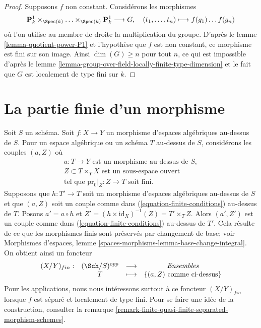 \begin{proof}
Supposons $f$ non constant. Considérons les morphismes
$$
\mathbf{P}^1_k \times_{\Spec(k)} \ldots \times_{\Spec(k)} \mathbf{P}^1_k
\longrightarrow G,
\quad (t_1, \ldots, t_n) \longmapsto f(g_1) \ldots f(g_n)
$$
où l'on utilise au membre de droite la multiplication du groupe.
D'après le lemme \ref{lemma-quotient-power-P1} et l'hypothèse que $f$
est non constant, ce morphisme est fini sur son image.
Ainsi $\dim(G) \geq n$ pour tout $n$, ce qui est impossible d'après le
lemme \ref{lemma-group-over-field-locally-finite-type-dimension}
et le fait que $G$ est localement de type fini sur $k$.
\end{proof}




\section{La partie finie d'un morphisme}
\label{section-finite}

\noindent
Soit $S$ un schéma.
Soit $f : X \to Y$ un morphisme d'espaces algébriques au-dessus de $S$.
Pour un espace algébrique ou un schéma $T$ au-dessus de $S$, considérons les couples
$(a, Z)$ où
\begin{equation}
\label{equation-finite-conditions}
\begin{matrix}
a : T \to Y\text{ est un morphisme au-dessus de }S, \\
Z \subset T \times_Y X\text{ est un sous-espace ouvert} \\
\text{tel que }\text{pr}_0|_Z : Z \to T\text{ soit fini.}
\end{matrix}
\end{equation}
Supposons que $h : T' \to T$ soit un morphisme d'espaces algébriques au-dessus de $S$
et que $(a, Z)$ soit un couple comme dans (\ref{equation-finite-conditions}) au-dessus de $T$. Posons
$a' = a \circ h$ et $Z' = (h \times \text{id}_X)^{-1}(Z) = T' \times_T Z$.
Alors $(a', Z')$ est un couple comme dans (\ref{equation-finite-conditions}) au-dessus de $T'$.
Cela résulte de ce que les morphismes finis sont préservés par changement de base; voir
Morphismes d'espaces, lemme \ref{spaces-morphisms-lemma-base-change-integral}.
On obtient ainsi un foncteur
\begin{equation}
\label{equation-finite}
\begin{matrix}
(X/Y)_{fin} : &
(\Sch/S)^{opp} &
\longrightarrow &
\textit{Ensembles} \\
& T & \longmapsto &
\{(a, Z)\text{ comme ci-dessus}\}
\end{matrix}
\end{equation}
Pour les applications, nous nous intéressons surtout à ce foncteur $(X/Y)_{fin}$
lorsque $f$ est séparé et localement de type fini. Pour se faire une idée
de la construction, consulter la
remarque \ref{remark-finite-quasi-finite-separated-morphism-schemes}.


